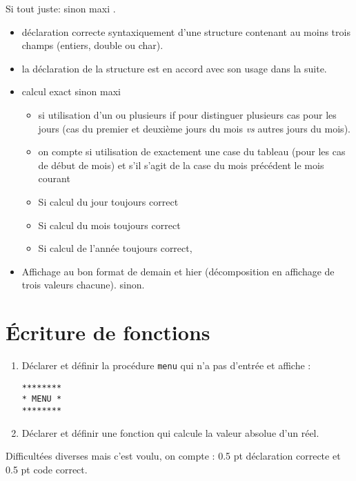 \begin{correction}
  \begin{baremeenv}
Si tout juste:  sinon maxi .
    \begin{itemize}
      \item {} déclaration correcte syntaxiquement d'une structure
      contenant au moins trois champs (entiers, double ou char).
      \item {} la déclaration de la structure est en accord avec son usage
dans la suite.
      \item {} calcul exact sinon maxi  
        \begin{itemize}
        \item {}  si utilisation d'un ou plusieurs if pour distinguer plusieurs
          cas pour les jours (cas du premier et deuxième jours du mois
          \emph{vs} autres jours du mois).
        \item {} on compte si utilisation de exactement une case  du
            tableau (pour les cas de début de mois) et  s'il s'agit de la case du mois précédent le
            mois courant 
\item {} Si calcul du jour toujours correct
\item {} Si calcul du mois toujours correct
\item {} Si calcul de l'année toujours correct, 
        \end{itemize}
      \item {} Affichage au bon format de demain et hier
        (décomposition en affichage de trois valeurs
        chacune). sinon.
   \end{itemize}
  \end{baremeenv}
\end{correction}

\section{Écriture de fonctions}
\begin{enumerate}
\item Déclarer et définir la procédure \verb|menu| qui n'a pas d'entrée et
  affiche :\label{item:menu}
\begin{small}
\begin{verbatim}
********
* MENU *
********
\end{verbatim}
\end{small}
\item Déclarer et définir une fonction qui calcule la valeur absolue d'un réel.\label{valeurabsolue}
\end{enumerate}

\begin{correction}
Difficultées diverses mais c'est voulu, on compte :
0.5 pt déclaration correcte et 0.5 pt code correct.

\end{correction}

\newpage
\thetotalpointsint